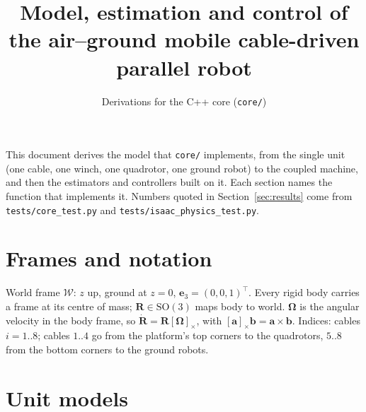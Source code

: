 \documentclass[11pt,a4paper]{article}
\title{Model, estimation and control of the air--ground mobile cable-driven parallel robot}
\author{Derivations for the C++ core (\texttt{core/})}
\date{}
\newcommand{\SO}{\mathrm{SO}(3)}
\newcommand{\hatm}[1]{[#1]_\times}
\newcommand{\T}{^{\!\top}}
\newcommand{\e}{\bm{e}}
\begin{document}
\maketitle

\noindent This document derives the model that \texttt{core/} implements, from the single unit (one cable, one
winch, one quadrotor, one ground robot) to the coupled machine, and then the estimators and controllers built on
it. Each section names the function that implements it. Numbers quoted in Section~\ref{sec:results} come from
\texttt{tests/core\_test.py} and \texttt{tests/isaac\_physics\_test.py}.

\tableofcontents

\section{Frames and notation}
World frame $\mathcal{W}$: $z$ up, ground at $z=0$, $\e_3=(0,0,1)\T$. Every rigid body carries a frame at its
centre of mass; $\bm{R}\in\SO$ maps body to world. $\bm{\Omega}$ is the angular velocity in the body frame, so
$\dot{\bm{R}}=\bm{R}\hatm{\bm{\Omega}}$, with $\hatm{\bm a}\bm b=\bm a\times\bm b$. Indices: cables
$i=1..8$; cables $1..4$ go from the platform's top corners to the quadrotors, $5..8$ from the bottom corners to the
ground robots.

\begin{center}\end{center}

\section{Unit models}
\end{document}
